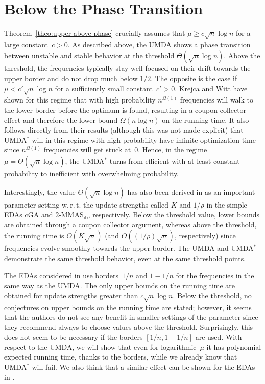 \documentclass[11pt, a4paper]{article}
\newcommand{\umdastar}{UMDA$^*$\xspace}
\newcommand{\umda}{UMDA\xspace}
\newcommand{\wrt}{w.\,r.\,t.\xspace}
\begin{document}
\section{Below the Phase Transition}
\label{sec:upperBoundTwo}
Theorem~\ref{theo:upper-above-phase} crucially assumes that $\mu\ge c\sqrt{n}\log n$ for 
a large constant~$c>0$. As described above, the \umda shows a phase transition between unstable 
and stable behavior at the threshold $\Theta(\sqrt{n}\log n)$. Above the threshold, 
the frequencies typically stay well focused on their drift towards the upper border and do not 
 drop much below $1/2$. The opposite is the case if $\mu<c'\sqrt{n}\log n$ for a sufficiently 
small constant~$c'>0$. Krejca and Witt \cite{KrejcaWittFOGA2017} have shown for this regime 
that with high probability 
$n^{\Omega(1)}$ frequencies 
will walk to the lower border before the optimum is found, resulting 
in a coupon collector effect and 
therefore the lower bound $\Omega(n\log n)$ on the running time. It also follows 
directly from their results (although this was not made explicit) that \umdastar will  
in this regime with high probability  have infinite optimization time since 
$n^{\Omega(1)}$ frequencies will get stuck at~$0$. Hence, in the regime $\mu=\Theta(\sqrt{n}\log n)$, 
the \umdastar turns from efficient with at least constant probability to inefficient 
with overwhelming probability.

Interestingly, the value $\Theta(\sqrt{n}\log n)$ has also been derived in \cite{SudholtWitt2016} 
as an important parameter setting 
\wrt the update strengths called $K$ and $1/\rho$ 
in the simple EDAs cGA and $2$-MMAS$_\mathrm{ib}$, respectively. Below the threshold value, lower bounds are obtained
through a coupon collector argument, whereas above the threshold, the running time is 
$O(K\sqrt{n})$ (and $O((1/\rho)\sqrt{n})$, respectively) 
since frequencies evolve smoothly towards the upper border. The \umda and \umdastar demonstrate the same 
threshold behavior, even at the same threshold points.

The EDAs considered in \cite{SudholtWitt2016} use borders~$1/n$ and $1-1/n$ 
for the frequencies in the same way as the \umda. The only upper bounds on the running time are obtained for update strengths  
greater than $c\sqrt{n}\log n$. Below the threshold, no conjectures on upper bounds on the running time are stated; however, 
 it seems that the authors do not see any benefit in smaller settings of the parameter since they recommend always to 
choose values above the threshold. Surprisingly, this does not seem to be necessary if the borders $[1/n,1-1/n]$ 
are used. With respect to the \umda, we will show that  even for logarithmic~$\mu$ it has polynomial expected running time, 
thanks to the borders, while we already know that \umdastar will fail. 
We also think that a similar effect can  be shown for the EDAs in  \cite{SudholtWitt2016}.
\end{document}

